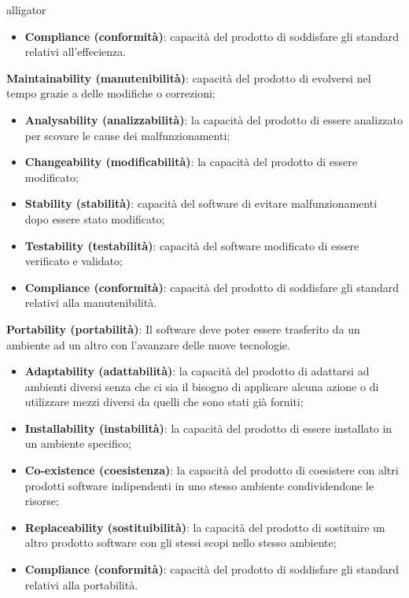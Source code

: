 \begin{labeling}{alligator}
\begin{itemize}
		\item \textbf{Compliance (conformità)}: capacità del prodotto di soddisfare gli standard relativi all'effecienza.
		
	\end{itemize}
	
	\item \textbf{Maintainability (manutenibilità)}: capacità del prodotto di evolversi nel tempo grazie a delle modifiche o correzioni;
	\begin{itemize}
		\item \textbf{Analysability (analizzabilità)}: la capacità del prodotto di essere analizzato per scovare le cause dei malfunzionamenti;
		
		\item \textbf{Changeability (modificabilità)}: la capacità del prodotto di essere modificato;
		
		\item \textbf{Stability (stabilità)}: capacità del software di evitare malfunzionamenti dopo essere stato modificato;
		
		\item \textbf{Testability (testabilità)}: capacità del software modificato di essere verificato e validato;
		
		\item \textbf{Compliance (conformità)}: capacità del prodotto di soddisfare gli standard relativi alla manutenibilità.
	\end{itemize}
	
	\item \textbf{Portability (portabilità)}: Il software deve poter essere trasferito da un ambiente ad un altro con l'avanzare delle nuove tecnologie.
	\begin{itemize}
		\item \textbf{Adaptability (adattabilità)}: la capacità del prodotto di adattarsi ad ambienti diversi senza che ci sia il bisogno di applicare alcuna azione o di utilizzare mezzi diversi da quelli che sono stati già forniti;
		
		\item \textbf{Installability (instabilità)}: la capacità del prodotto di essere installato in un ambiente specifico;
		
		\item \textbf{Co-existence (coesistenza)}: la capacità del prodotto di coesistere con altri prodotti software indipendenti in uno stesso ambiente condividendone le risorse;
		
		\item \textbf{Replaceability (sostituibilità)}: la capacità del prodotto di sostituire un altro prodotto software con gli stessi scopi nello stesso ambiente;
		
		\item \textbf{Compliance (conformità)}: capacità del prodotto di soddisfare gli standard relativi alla portabilità.
	\end{itemize}
\end{labeling}

